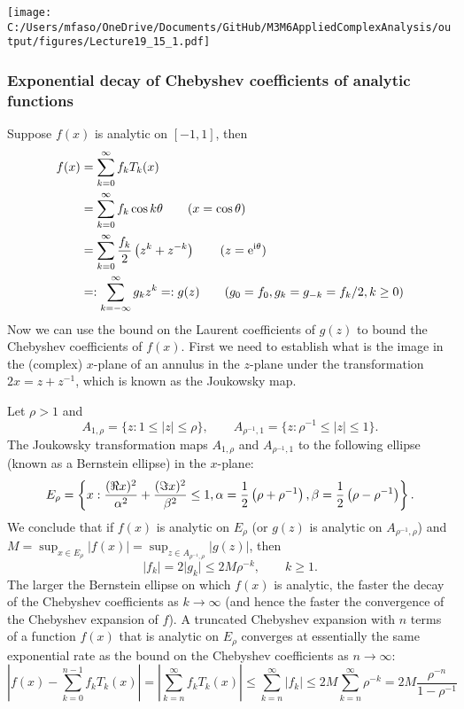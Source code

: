 \documentclass[12pt,landscape]{article}
\def\I{ {\rm i} }
\def\E{ {\rm e} }
\begin{document}
{\texttt{[image: C:/Users/mfaso/OneDrive/Documents/GitHub/M3M6AppliedComplexAnalysis/output/figures/Lecture19\_15\_1.pdf]}

\subsubsection{Exponential decay of Chebyshev coefficients of analytic functions}
Suppose $f(x)$ is analytic on $[-1, 1]$, then
\begin{align*}
f(x) & = \sum_{k = 0}^{\infty} f_k T_k(x) \\
     & =\sum_{k = 0}^{\infty} f_k \cos k\theta \qquad (x = \cos\theta) \\
     & = \sum_{k = 0}^{\infty} {f_k \over 2}\left( z^k + z^{-k}\right)  \qquad (z = \E^{\I \theta}) \\
     & =: \sum_{k = -\infty}^{\infty} g_k z^{k} =: g(z) \qquad (g_0 = f_0, g_{k} = g_{-k} = f_k/2, k\geq 0)
\end{align*}
Now we can use the bound on the Laurent coefficients of $g(z)$ to bound the Chebyshev coefficients of $f(x)$. First we need to establish what is the image in the (complex) $x$-plane of an annulus in the $z$-plane under the transformation $2x = z + z^{-1}$, which is known as the Joukowsky map.
\newpage

Let $\rho > 1$ and
\[
A_{1,\rho} =  \lbrace z : 1 \leq \vert z \vert \leq \rho \rbrace, \qquad  A_{\rho^{-1},1} =  \lbrace z : \rho^{-1} \leq \vert z \vert \leq 1 \rbrace.
\]
The Joukowsky transformation maps $A_{1,\rho}$ and $A_{\rho^{-1},1}$ to the following ellipse (known as a Bernstein ellipse) in the $x$-plane:
\[
E_{\rho} = \left\lbrace x : {(\Re x)^2 \over \alpha^2} + {(\Im x)^2 \over \beta^2} \leq 1, \alpha = {1 \over 2}\left( \rho + \rho^{-1} \right),   \beta = {1 \over 2}\left( \rho - \rho^{-1} \right) \right\rbrace.
\]
\newpage
We conclude that if $f(x)$ is analytic on $E_{\rho}$ (or $g(z)$ is analytic on $A_{\rho^{-1},\rho}$) and $M = \sup_{x \in  E_{\rho}} |f(x)| = \sup_{z \in  A_{\rho^{-1},\rho}} |g(z)|$, then
\[
\vert f_k \vert = 2 \vert g_k \vert \leq 2M\rho^{-k}, \qquad k \geq 1.
\]
The larger the Bernstein ellipse on which $f(x)$ is analytic, the faster the decay of the Chebyshev coefficients as $k \to \infty$ (and hence the faster the convergence of the Chebyshev expansion of $f$).
A truncated Chebyshev expansion with $n$ terms of a function $f(x)$ that is analytic on $E_{\rho}$ converges at essentially the same exponential rate as the bound on the Chebyshev coefficients as $n \to \infty$:
\[
\left \vert f(x) -   \sum_{k = 0}^{n-1}f_kT_k(x) \right\vert  = \left \vert  \sum_{k = n}^{\infty}f_kT_k(x) \right\vert \leq \sum_{k = n}^{\infty}\vert f_k \vert \leq 2M \sum_{k = n}^{\infty} \rho^{-k} = 2M \frac{\rho^{-n}}{1 - \rho^{-1}}
\]

}
\end{document}
